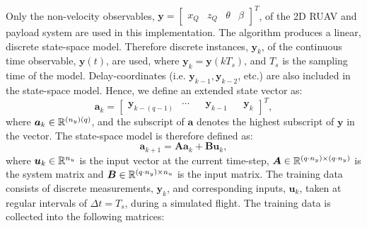         \paragraph{}
        Only the non-velocity observables,
        $\bm{y} = \begin{bmatrix}
            x_Q & z_Q & \theta & \beta
        \end{bmatrix}^T$,
        of the 2D RUAV and payload system are used in this implementation.
        The algorithm produces a linear, discrete state-space model.
        Therefore discrete instances, $\bm{y}_k$, of the continuous time observable, $\bm{y}(t)$, are used, where $\bm{y}_k = \bm{y}(k T_s)$, and $T_s$ is the sampling time of the model.    
        Delay-coordinates (i.e. $\bm{y}_{k-1}, \bm{y}_{k-2}$, etc.) are also included in the state-space model.
        Hence, we define an extended state vector as:
        \begin{equation}
            \bm{a}_{k} = \begin{bmatrix} \bm{y}_{k-(q-1)} & \cdots & & \bm{y}_{k-1} & & \bm{y}_{k} \end{bmatrix}^T ,
        \end{equation}
        where $\bm{a}_k \in \mathbb{R}^{(n_y)(q)}$, and the subscript of $\bm{a}$ denotes the highest subscript of ${\bm{y}}$ in the vector.
        The state-space model is therefore defined as:
        \begin{equation} \label{eq:dmd_state_space}
            \bm{a}_{k+1} = \bm{A} \bm{a}_k + \bm{B} \bm{u}_k ,
        \end{equation}
        where \( \bm{u}_k \in \mathbb{R}^{n_u} \) is the input vector at the current time-step, 
        \( \bm{A} \in \mathbb{R}^{(q \cdot n_y) \times (q \cdot n_y)} \) is the system matrix and \( \bm{B} \in \mathbb{R}^{(q \cdot n_y) \times n_u} \) is the input matrix.
        The training data consists of discrete measurements, $\bm{y}_k$, and corresponding inputs, $\bm{u}_k$, taken at regular intervals of $\Delta t = T_s$, during a simulated flight. 
        The training data is collected into the following matrices:
